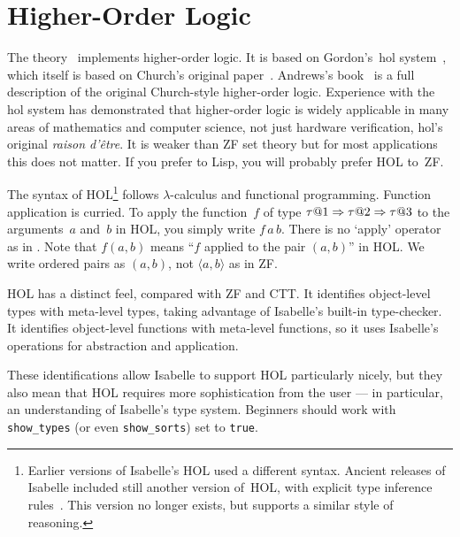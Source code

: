 \chapter{Higher-Order Logic}

The theory~ implements higher-order logic.  It is based on
Gordon's~{\sc hol} system~\cite{mgordon-hol}, which itself is based on
Church's original paper~\cite{church40}.  Andrews's book~\cite{andrews86} is a
full description of the original Church-style higher-order logic.  Experience
with the {\sc hol} system has demonstrated that higher-order logic is widely
applicable in many areas of mathematics and computer science, not just
hardware verification, {\sc hol}'s original \textit{raison d'{\^e}tre\/}.  It
is weaker than ZF set theory but for most applications this does not matter.
If you prefer {\ML} to Lisp, you will probably prefer HOL to~ZF.

The syntax of HOL\footnote{Earlier versions of Isabelle's HOL used a different
  syntax.  Ancient releases of Isabelle included still another version of~HOL,
  with explicit type inference rules~\cite{paulson-COLOG}.  This version no
  longer exists, but  supports a similar style of reasoning.}
follows $\lambda$-calculus and functional programming.  Function application
is curried.  To apply the function~$f$ of type $\tau@1\To\tau@2\To\tau@3$ to
the arguments~$a$ and~$b$ in HOL, you simply write $f\,a\,b$.  There is no
`apply' operator as in .  Note that $f(a,b)$ means ``$f$ applied to
the pair $(a,b)$'' in HOL.  We write ordered pairs as $(a,b)$, not $\langle
a,b\rangle$ as in ZF.

HOL has a distinct feel, compared with ZF and CTT.  It identifies object-level
types with meta-level types, taking advantage of Isabelle's built-in
type-checker.  It identifies object-level functions with meta-level functions,
so it uses Isabelle's operations for abstraction and application.

These identifications allow Isabelle to support HOL particularly nicely, but
they also mean that HOL requires more sophistication from the user --- in
particular, an understanding of Isabelle's type system.  Beginners should work
with \texttt{show_types} (or even \texttt{show_sorts}) set to \texttt{true}.


